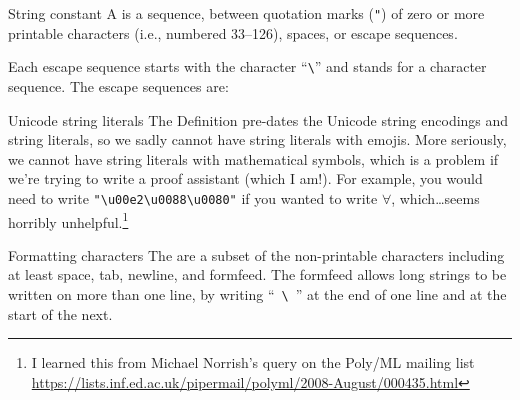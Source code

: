 \begin{definition}{String constant}
A  is a sequence, between quotation marks (\texttt{"})
of zero or more printable characters (i.e., numbered 33--126), spaces,
or escape sequences.

Each escape sequence starts with the character ``\verb+\+'' and stands
for a character sequence. The escape sequences are:
\end{definition}

\begin{remark}{Unicode string literals}
The Definition pre-dates the Unicode string encodings and string
literals, so we sadly cannot have string literals with emojis. More
seriously, we cannot have string literals with mathematical symbols,
which is a problem if we're trying to write a proof assistant (which I
am!). For example, you would need to write \verb|"\u00e2\u0088\u0080"|
if you wanted to write $\forall$, which\dots seems horribly
unhelpful.\footnote{I learned this from Michael Norrish's query on the
Poly/ML mailing list \url{https://lists.inf.ed.ac.uk/pipermail/polyml/2008-August/000435.html}}
\end{remark}

\begin{definition}{Formatting characters}\label{defn:syntax-core:formatting-characters}
The  are a subset of the non-printable
characters including at least space, tab, newline, and formfeed. The
formfeed allows long strings to be written on more than one line, by
writing ``~\verb+\+~'' at the end of one line and at the start of the next.
\end{definition}

